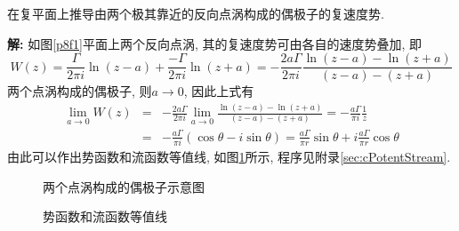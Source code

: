 \begin{problem}[问题6.8]
在复平面上推导由两个极其靠近的反向点涡构成的偶极子的复速度势.
\end{problem}

\begin{solution}
\textbf{解:} 如图\ref{p8f1}平面上两个反向点涡, 其的复速度势可由各自的速度势叠加, 即
\[
W(z) = \frac{\Gamma}{2\pi i}\ln(z-a) + \frac{-\Gamma}{2\pi i}\ln(z+a)
= -\frac{2a\Gamma}{2\pi i}\frac{\ln(z-a)-\ln(z+a)}{(z-a)-(z+a)}
\]
两个点涡构成的偶极子, 则$a\rightarrow 0$, 因此上式有
\begin{eqnarray}
\lim_{a\rightarrow 0} W(z) &=& -\frac{2a\Gamma}{2\pi i}\lim_{a\rightarrow 0}\frac{\ln(z-a)-\ln(z+a)}{(z-a)-(z+a)}
= -\frac{a\Gamma}{\pi i}\frac{1}{z}\nonumber\\
&=& -\frac{a\Gamma}{\pi i}(\cos\theta - i\sin\theta)= \frac{a\Gamma}{\pi r}\sin\theta + i\frac{a\Gamma}{\pi r}\cos\theta\nonumber
\end{eqnarray}
由此可以作出势函数和流函数等值线, 如图\ref{p8f2}所示, 程序见附录\ref{sec:cPotentStream}.
\begin{figure}[!htb]
\begin{minipage}[b]{.5\textwidth}
\centering

\caption{\label{p8f1}两个点涡构成的偶极子示意图}
\end{minipage}%
\begin{minipage}[b]{.5\textwidth}
\centering

\caption{\label{p8f2}势函数和流函数等值线}
\end{minipage}
\end{figure}

\end{solution}
